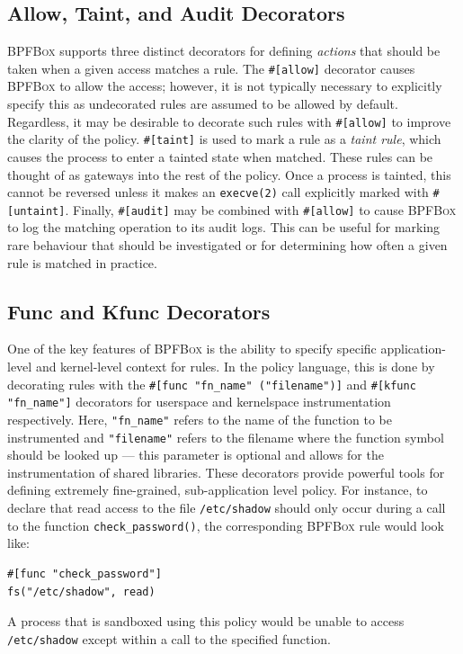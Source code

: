 \documentclass[
  fontsize=12pt,
  titlepage=firstiscover,
  paper=letter,
oneside,
  cleardoublepage=plain,
  parskip=half-,
  DIV=10,
  parindent,
  appendixprefix,
  chapterprefix,
  listof=totoc,
]{scrbook}
\newcommand{\bpfbox}{\textsc{BPFBox}}
\begin{document}
\subsection{Allow, Taint, and Audit Decorators}\label{ss:bpfbox-allow}

\bpfbox{} supports three distinct decorators for defining \textit{actions} that should be
taken when a given access matches a rule. The \lstinline[language=bpfbox]{#[allow]}
decorator causes \bpfbox{} to allow the access; however, it is not typically necessary to
explicitly specify this as undecorated rules are assumed to be allowed by default.
Regardless, it may be desirable to decorate such rules with
\lstinline[language=bpfbox]{#[allow]} to improve the clarity of the policy.
\lstinline[language=bpfbox]{#[taint]} is used to mark a rule as a \textit{taint rule},
which causes the process to enter a tainted state when matched. These rules can be thought
of as gateways into the rest of the policy.  Once a process is tainted, this cannot be
reversed unless it makes an \texttt{execve(2)} call explicitly marked with
\lstinline[language=bpfbox]{#[untaint]}.  Finally, \lstinline[language=bpfbox]{#[audit]}
may be combined with \lstinline[language=bpfbox]{#[allow]} to cause \bpfbox{} to log the
matching operation to its audit logs. This can be useful for marking rare behaviour that
should be investigated or for determining how often a given rule is matched in practice.



\subsection{Func and Kfunc Decorators}\label{ss:bpfbox-kfunc}

One of the key features of \bpfbox{} is the ability to specify specific application-level
and kernel-level context for rules. In the policy language, this is done by decorating
rules with the \lstinline[language=bpfbox]{#[func "fn_name" ("filename")]} and
\lstinline[language=bpfbox]{#[kfunc "fn_name"]} decorators for userspace and kernelspace
instrumentation respectively. Here, \lstinline[language=bpfbox]{"fn_name"} refers to the
name of the function to be instrumented and \lstinline[language=bpfbox]{"filename"} refers
to the filename where the function symbol should be looked up --- this parameter is
optional and allows for the instrumentation of shared libraries.  These decorators provide
powerful tools for defining extremely fine-grained, sub-application level policy. For
instance, to declare that read access to the file \texttt{/etc/shadow} should only occur
during a call to the function \texttt{check\_password()}, the corresponding \bpfbox{} rule
would look like:
\begin{lstlisting}[language=bpfbox]
#[func "check_password"]
fs("/etc/shadow", read)
\end{lstlisting}
A process that is sandboxed using this policy would be unable to access
\texttt{/etc/shadow} except within a call to the specified function.
\end{document}
